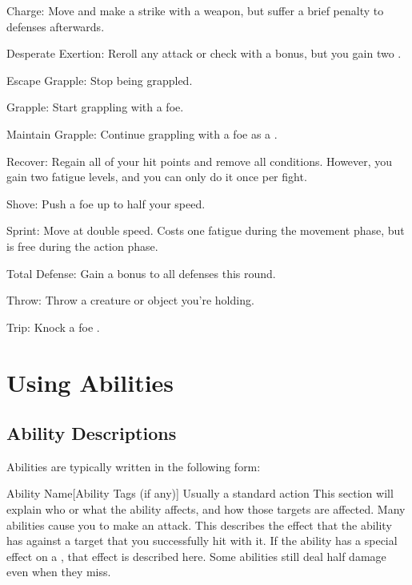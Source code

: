   \begin{raggeditemize}
    \item Charge: Move and make a strike with a weapon, but suffer a brief  penalty to defenses afterwards.
    \item Desperate Exertion: Reroll any attack or check with a  bonus, but you gain two .
    \item Escape Grapple: Stop being grappled.
    \item Grapple: Start grappling with a foe.
    \item Maintain Grapple: Continue grappling with a foe as a .
    \item Recover: Regain all of your hit points and remove all conditions. However, you gain two fatigue levels, and you can only do it once per fight.
    \item Shove: Push a foe up to half your speed.
    \item Sprint: Move at double speed. Costs one fatigue during the movement phase, but is free during the action phase.
    \item Total Defense: Gain a  bonus to all defenses this round.
    \item Throw: Throw a creature or object you're holding.
    \item Trip: Knock a foe \prone.
  \end{raggeditemize}

\section{Using Abilities}\label{Using Abilities}

  \subsection{Ability Descriptions}
    Abilities are typically written in the following form:
    \begin{activeability}{Ability Name}[Ability Tags (if any)]
      \abilityusagetime Usually a standard action
      \rankline
      This section will explain who or what the ability affects, and how those targets are affected.
      Many abilities cause you to make an attack.
      \hit This describes the effect that the ability has against a target that you successfully hit with it.
      \crit If the ability has a special effect on a , that effect is described here.
      \miss Some abilities still deal half damage even when they miss.
    \end{activeability}

